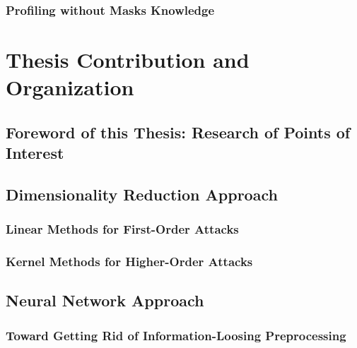 \subsubsection{Profiling without Masks Knowledge}

\section{Thesis Contribution and Organization}
\subsection{Foreword of this Thesis: Research of Points of Interest}
\subsection{Dimensionality Reduction Approach}
\subsubsection{Linear Methods for First-Order Attacks}
\subsubsection{Kernel Methods for Higher-Order Attacks}
\subsection{Neural Network Approach}
\subsubsection{Toward Getting Rid of Information-Loosing Preprocessing}